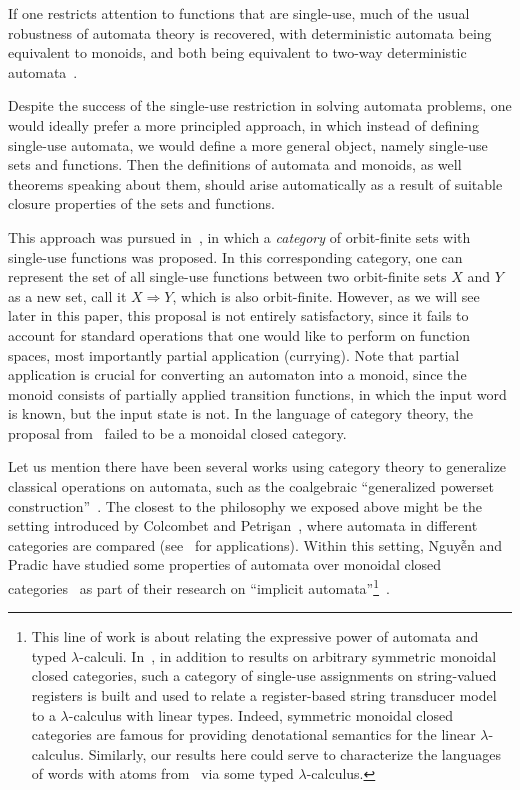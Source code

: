 \documentclass[10pt,a4paper]{amsart}
\numberwithin{equation}{section}
\theoremstyle{plain}
\begin{document}
If one restricts attention to functions that are single-use, much of the usual robustness of automata theory is recovered, with deterministic automata being equivalent to monoids, and both being equivalent to two-way deterministic automata~\cite{bojanczykstefanski2020}.

Despite the success of the single-use restriction in solving automata problems, one would ideally prefer a more principled approach, in which instead of defining single-use automata, we would define a more general object, namely single-use sets and functions. Then the definitions of  automata and monoids, as well theorems speaking about them, should arise automatically as a result of suitable closure properties of the sets and functions.

This approach was pursued in~\cite{stefanski-phd}, in which a \emph{category} of orbit-finite sets with single-use functions was proposed. In this corresponding category,  one can represent the set of all single-use functions between two orbit-finite sets $X$ and $Y$ as a new set, call it $X \Rightarrow Y$, which is  also orbit-finite.  However, as we will see later in this paper, this proposal is not entirely satisfactory, since it fails to account for standard operations that one would like to perform on function spaces, most importantly partial application (currying). Note that partial application is crucial for converting an automaton into a monoid, since the monoid consists of partially applied transition functions, in which the input word is known, but the input state is not. In the language of category theory, the proposal from~\cite{stefanski-phd} failed to be a monoidal closed category.

Let us mention there have been several works using category theory to generalize classical operations on automata, such as the coalgebraic ``generalized powerset construction''~\cite{DBLP:journals/corr/abs-1302-1046}. The closest to the philosophy we exposed above might be the setting introduced by Colcombet and Petrişan~\cite{colcombet2020automata}, where automata in different categories are compared (see~\cite{ColcombetPS21,Aristote24} for applications). Within this setting, Nguy{\~{ê}}n and Pradic have studied some properties of automata over monoidal closed categories~\cite[Sections~1.2.3~and~4.7--4.8]{titoPhD} as part of their research on ``implicit automata''\footnote{\label{ftn:iatlc}This line of work is about relating the expressive power of automata and typed $\lambda$-calculi. In~\cite{IATLC2,titoPhD}, in addition to results on arbitrary symmetric monoidal closed categories, such a category of single-use assignments on string-valued registers is built and used to relate a register-based string transducer model to a $\lambda$-calculus with linear types. Indeed, symmetric monoidal closed categories are famous for providing denotational semantics for the linear $\lambda$-calculus. Similarly, our results here could serve to characterize the languages of words with atoms from~\cite{bojanczykstefanski2020} via some typed $\lambda$-calculus.}~\cite{IATLC,IATLC2,titoPhD,pradic2024implicit}.
\end{document}
